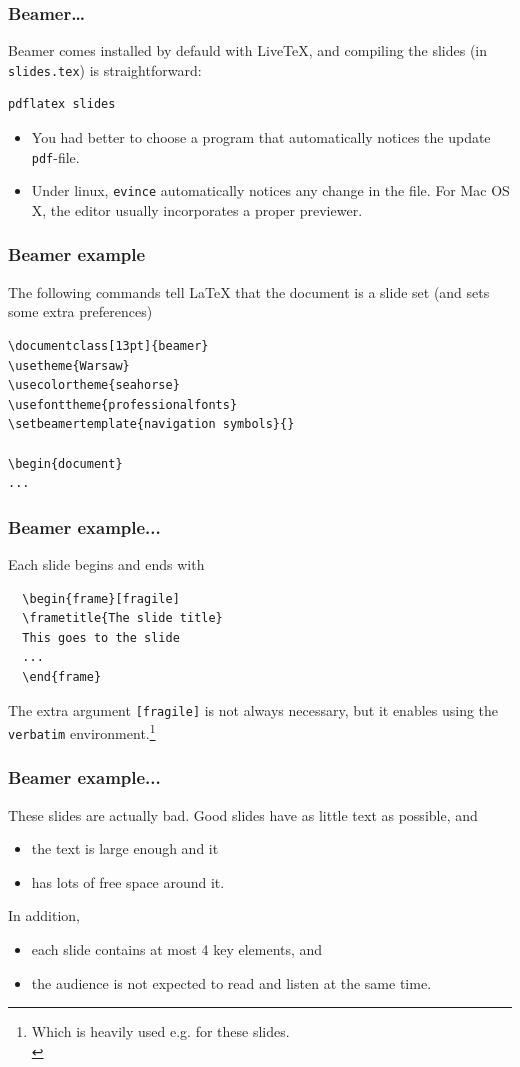 \documentclass[13pt]{beamer}
\begin{document}
\begin{frame}[fragile]\frametitle{Beamer\ldots}
Beamer comes installed by defauld with LiveTeX, 
and compiling the slides (in \verb|slides.tex|) is straightforward:
\begin{verbatim}
pdflatex slides
\end{verbatim}
\begin{itemize}
\item You had better to choose a program that automatically notices the update 
\texttt{pdf}-file.
\item Under linux,  \texttt{evince} automatically notices any change in the
file. For Mac OS X, the editor usually incorporates a proper previewer.
\end{itemize}
\end{frame}

\begin{frame}[fragile]\frametitle{Beamer example}
The following commands tell LaTeX that the document is a slide set (and sets
some extra preferences)
\begin{verbatim}
\documentclass[13pt]{beamer}
\usetheme{Warsaw}
\usecolortheme{seahorse}
\usefonttheme{professionalfonts}
\setbeamertemplate{navigation symbols}{}

\begin{document}
...
\end{verbatim}
\end{frame}


\begin{frame}[fragile]\frametitle{Beamer example...}
Each slide begins and ends with 
\begin{verbatim}
  \begin{frame}[fragile]
  \frametitle{The slide title}
  This goes to the slide
  ...
  \end{frame}
\end{verbatim}
The extra argument \texttt{[fragile]} is not always necessary, but it enables
using the \texttt{verbatim} environment.\footnote{Which is heavily used e.g.
for these slides.\\\mbox{}}
\end{frame}


\begin{frame}[fragile]\frametitle{Beamer example...}
\normalsize
These slides are actually bad. Good slides have as little text as
possible, and\medskip
\begin{itemize}
\bfseries
\item the text is large enough and it
\item has lots of free space around it.
\end{itemize}\bigskip

In addition,\medskip
\begin{itemize}
\sl
\item each slide contains at most 4 key elements, and 
\item the audience is not expected to read and listen at the same time.
\end{itemize}
\end{frame}
\end{document}
